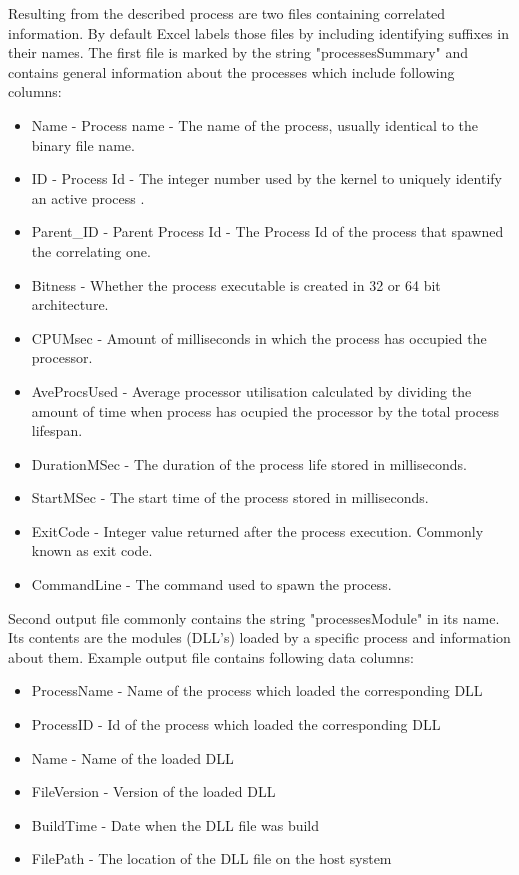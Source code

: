 \documentclass[a4paper,twoside,12pt]{book}
\begin{document}
Resulting from the described process are two files containing correlated information. By 
default Excel labels those files by including identifying suffixes in their names. The 
first file is marked by the string "processesSummary" and contains general information 
about the processes which include following columns:
\begin{itemize}
	\item Name - Process name - The name of the process, usually identical to the binary 
	file name.
	\item ID - Process Id - The integer number used by the kernel to uniquely identify 
	an active process \cite{bib:MicrosoftWinInternals}.
	\item Parent\_ID - Parent Process Id - The Process Id of the process that spawned the 
	correlating one.
	\item Bitness - Whether the process executable is created in 32 or 64 bit architecture.
	\item CPUMsec - Amount of milliseconds in which the process has occupied the processor. 
	\item AveProcsUsed - Average processor utilisation calculated by dividing the amount
	of time when process has ocupied the processor by the total process lifespan. 
	\item DurationMSec - The duration of the process life stored in milliseconds.
	\item StartMSec - The start time of the process stored in milliseconds.
	\item ExitCode - Integer value returned after the process execution. Commonly known as 
	exit code.
	\item CommandLine - The command used to spawn the process.
\end{itemize}

Second output file commonly contains the string "processesModule" in its name. Its contents
are the modules (DLL's) loaded by a specific process and information about them. Example 
output file contains following data columns:
\begin{itemize}
	\item ProcessName - Name of the process which loaded the corresponding DLL
	\item ProcessID - Id of the process which loaded the corresponding DLL
	\item Name - Name of the loaded DLL
	\item FileVersion - Version of the loaded DLL
	\item BuildTime - Date when the DLL file was build
	\item FilePath - The location of the DLL file on the host system
\end{itemize}
\end{document}

